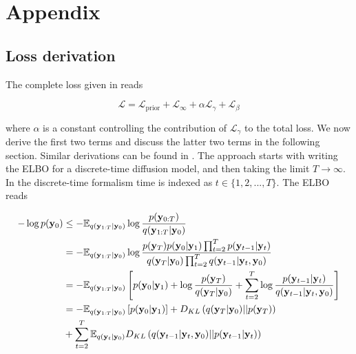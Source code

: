 \section{Appendix}

\subsection{Loss derivation}

The complete loss given in \parencite{Maggiora2023} reads

\begin{equation}
\mathcal{L} = \mathcal{L}_{\mathrm{prior}} + \mathcal{L}_{\infty} + \alpha\mathcal{L}_{\gamma} + \mathcal{L}_{\beta}
\end{equation}

where $\alpha$ is a constant controlling the contribution of $\mathcal{L}_{\gamma}$ to the total loss. We now derive the first two terms and discuss the latter two terms in the following section. Similar derivations can be found in \parencite{Maggiora2023,Kingma2021,Ribeiro2024}. The approach starts with writing the ELBO for a discrete-time diffusion model, and then taking the limit $T\rightarrow \infty$. In the discrete-time formalism time is indexed as $t\in \{1,2,...,T\}$. The ELBO reads

\begin{align*}
-\log p(\bold{y}_{0}) &\leq - \mathbb{E}_{q(\bold{y}_{1:T}\lvert\bold{y}_{0})} \log \frac{p(\bold{y}_{0:T})}{q(\bold{y}_{1:T}\lvert\bold{y}_{0})}\\
&= -\mathbb{E}_{q(\bold{y}_{1:T}\lvert\bold{y}_{0})} \log \frac{p(\bold{y}_{T})p(\bold{y}_0\lvert\bold{y}_1) \prod_{t=2}^{T}p(\bold{y}_{t-1}\lvert\bold{y}_t)}{q(\bold{y}_T\lvert\bold{y}_0)\prod_{t=2}^{T}q(\bold{y}_{t-1}\lvert\bold{y}_t,\bold{y}_0)}\\
&= -\mathbb{E}_{q(\bold{y}_{1:T}\lvert\bold{y}_{0})} \left[ p(\bold{y}_0\lvert\bold{y}_1) + \log \frac{p(\bold{y}_{T})}{q(\bold{y}_T\lvert\bold{y}_0)} + \sum_{t=2}^{T} \log \frac{p(\bold{y}_{t-1}\lvert\bold{y}_t)}{q(\bold{y}_{t-1}\lvert\bold{y}_t,\bold{y}_0)}\right]\\
&= -\mathbb{E}_{q(\bold{y}_{1:T}\lvert\bold{y}_{0})} \left[ p(\bold{y}_0\lvert\bold{y}_1)\right] + D_{KL}\left(q(\bold{y}_T\lvert\bold{y}_0) \lvert\lvert p(\bold{y}_{T})\right) \\
&+ \sum_{t=2}^{T} \mathbb{E}_{q(\bold{y}_{t}\lvert\bold{y}_{0})} D_{KL}\left(q(\bold{y}_{t-1}\lvert\bold{y}_t,\bold{y}_0)\lvert\lvert p(\bold{y}_{t-1}\lvert\bold{y}_t) \right)
\end{align*}

